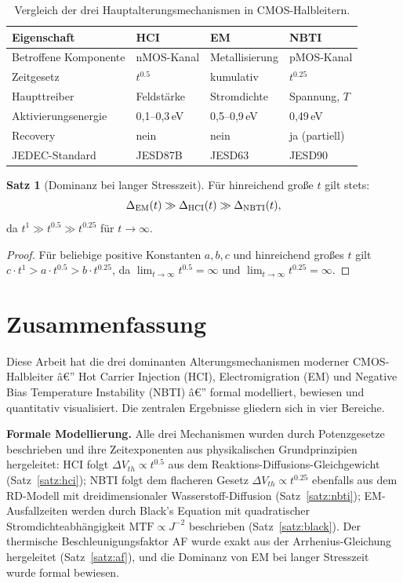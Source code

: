 ﻿\documentclass[a4paper,12pt]{article}
\theoremstyle{definition}
\newtheorem{satz}{Satz}
\begin{document}
\begin{table}[htbp]
	\centering
	\caption{Vergleich der drei Hauptalterungsmechanismen in CMOS-Halbleitern.}
	\label{tab:vergleich}
	\begin{tabular}{@{}llll@{}}
		\toprule
		Eigenschaft & HCI & EM & NBTI \\
		\midrule
		Betroffene Komponente & nMOS-Kanal & Metallisierung & pMOS-Kanal \\
		Zeitgesetz & $t^{0.5}$ & kumulativ & $t^{0.25}$ \\
		Haupttreiber & Feldstärke & Stromdichte & Spannung, $T$ \\
		Aktivierungsenergie & 0{,}1--0{,}3\,eV & 0{,}5--0{,}9\,eV & 0{,}49\,eV \\
		Recovery & nein & nein & ja (partiell) \\
		JEDEC-Standard & JESD87B & JESD63 & JESD90 \\
		\bottomrule
	\end{tabular}
\end{table}

\begin{satz}[Dominanz bei langer Stresszeit]
	Für hinreichend große $t$ gilt stets:
	\[
	\Delta_{\rm EM}(t) \gg \Delta_{\rm HCI}(t) \gg \Delta_{\rm NBTI}(t),
	\]
	da $t^1 \gg t^{0.5} \gg t^{0.25}$ für $t \to \infty$.
\end{satz}

\begin{proof}
	Für beliebige positive Konstanten $a, b, c$ und hinreichend großes $t$ gilt
	$c \cdot t^1 > a \cdot t^{0.5} > b \cdot t^{0.25}$, da
	$\lim_{t\to\infty} t^{0.5} = \infty$ und
	$\lim_{t\to\infty} t^{0.25} = \infty$.
	\qedhere
\end{proof}

\section{Zusammenfassung}

Diese Arbeit hat die drei dominanten Alterungsmechanismen moderner CMOS-Halbleiter
â€” Hot Carrier Injection (HCI), Electromigration (EM) und Negative Bias Temperature
Instability (NBTI) â€” formal modelliert, bewiesen und quantitativ visualisiert.
Die zentralen Ergebnisse gliedern sich in vier Bereiche.

\textbf{Formale Modellierung.}
Alle drei Mechanismen wurden durch Potenzgesetze beschrieben und ihre Zeitexponenten
aus physikalischen Grundprinzipien hergeleitet:
HCI folgt $\Delta V_{th} \propto t^{0.5}$ aus dem Reaktions-Diffusions-Gleichgewicht
(Satz~\ref{satz:hci}); NBTI folgt dem flacheren Gesetz
$\Delta V_{th} \propto t^{0.25}$ ebenfalls aus dem RD-Modell mit dreidimensionaler
Wasserstoff-Diffusion (Satz~\ref{satz:nbti}); EM-Ausfallzeiten werden durch
Black's Equation mit quadratischer Stromdichteabhängigkeit $\mathrm{MTF} \propto J^{-2}$
beschrieben (Satz~\ref{satz:black}). Der thermische Beschleunigungsfaktor AF wurde
exakt aus der Arrhenius-Gleichung hergeleitet (Satz~\ref{satz:af}), und die Dominanz
von EM bei langer Stresszeit wurde formal bewiesen.
\end{document}
